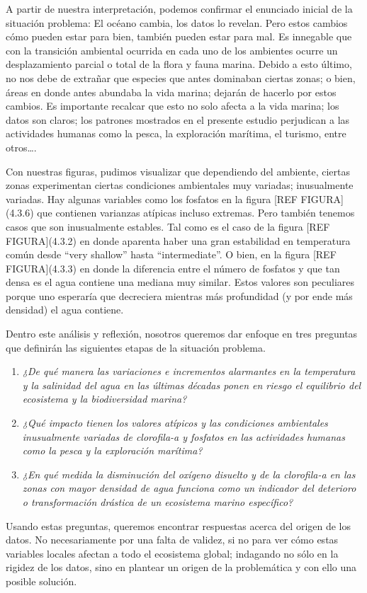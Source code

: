 A partir de nuestra interpretación, podemos confirmar el enunciado inicial de la situación problema: El océano cambia, los datos lo revelan. Pero estos cambios cómo pueden estar para bien, también pueden estar para mal. Es innegable que con la transición ambiental ocurrida en cada uno de los ambientes ocurre un desplazamiento parcial o total de la flora y fauna marina. Debido a esto último, no nos debe de extrañar que especies que antes dominaban ciertas zonas; o bien, áreas en donde antes abundaba la vida marina; dejarán de hacerlo por estos cambios. Es importante recalcar que esto no solo afecta a la vida marina; los datos son claros; los patrones mostrados en el presente estudio perjudican a las actividades humanas como la pesca, la exploración marítima, el turismo, entre otros….

Con nuestras figuras, pudimos visualizar que dependiendo del ambiente, ciertas zonas experimentan ciertas condiciones ambientales muy variadas; inusualmente variadas. Hay algunas variables como los fosfatos en la figura [REF FIGURA](4.3.6) que contienen varianzas atípicas incluso extremas. Pero también tenemos casos que son inusualmente estables. Tal como es el caso de la figura [REF FIGURA](4.3.2) en donde aparenta haber una gran estabilidad en temperatura común desde “very shallow” hasta “intermediate”. O bien, en la figura [REF FIGURA](4.3.3) en donde la diferencia entre el número de fosfatos y que tan densa es el agua contiene una mediana muy similar. Estos valores son peculiares porque uno esperaría que decreciera mientras más profundidad (y por ende más densidad) el agua contiene. 

Dentro este análisis y reflexión, nosotros queremos dar enfoque en tres preguntas que definirán las siguientes etapas de la situación problema.

\begin{enumerate}
    \item \textit{¿De qué manera las variaciones e incrementos alarmantes en la temperatura y la salinidad del agua en las últimas décadas ponen en riesgo el equilibrio del ecosistema y la biodiversidad marina?}
    \item \textit{¿Qué impacto tienen los valores atípicos y las condiciones ambientales inusualmente variadas de clorofila-a y fosfatos en las actividades humanas como la pesca y la exploración marítima?}
    \item \textit{¿En qué medida la disminución del oxígeno disuelto y de la clorofila-a en las zonas con mayor densidad de agua funciona como un indicador del deterioro o transformación drástica de un ecosistema marino específico?}
\end{enumerate}

Usando estas preguntas, queremos encontrar respuestas acerca del origen de los datos. No necesariamente por una falta de validez, si no para ver cómo estas variables locales afectan a todo el ecosistema global; indagando no sólo en la rigidez de los datos, sino en plantear un origen de la problemática y con ello una posible solución.




